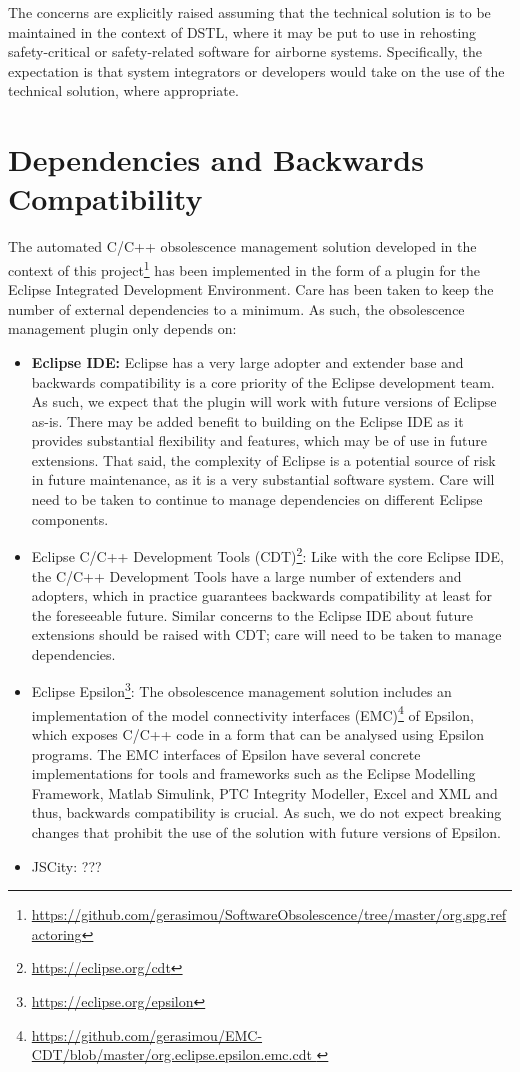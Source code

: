 \documentclass{llncs}
\begin{document}
The concerns are explicitly raised assuming that the technical solution is to be maintained in the context of DSTL, where it
may be put to use in rehosting safety-critical or safety-related software for airborne systems. Specifically, the expectation is that
system integrators or developers would take on the use of the technical solution, where appropriate.

\section{Dependencies and Backwards Compatibility}
The automated C/C++ obsolescence management solution developed in the context of this project\footnote{\url{https://github.com/gerasimou/SoftwareObsolescence/tree/master/org.spg.refactoring}} has been implemented in the form of a plugin for the Eclipse Integrated Development Environment. Care has been taken to keep the number of external dependencies to a minimum. As such, the obsolescence management plugin only depends on:
\begin{itemize}
\item \textbf{Eclipse IDE:} Eclipse has a very large adopter and extender base and backwards compatibility is a core priority of the Eclipse development team. As such, we expect that the plugin will work with future versions of Eclipse as-is. There may be added benefit to building on the Eclipse IDE as it provides substantial flexibility and features, which may be of use in future extensions. That said, the complexity of Eclipse is a potential source of risk in future maintenance, as it is a very substantial software system. Care will need to be taken to continue to manage dependencies on different Eclipse components.

\item Eclipse C/C++ Development Tools (CDT)\footnote{\url{https://eclipse.org/cdt}}: Like with the core Eclipse IDE, the C/C++ Development Tools have a large number of extenders and adopters, which in practice guarantees backwards compatibility at least for the foreseeable future. Similar concerns to the Eclipse IDE about future extensions should be raised with CDT; care will need to be taken to manage dependencies.

\item Eclipse Epsilon\footnote{\url{https://eclipse.org/epsilon}}: The obsolescence management solution includes an implementation of the model connectivity interfaces (EMC)\footnote{\url{https://github.com/gerasimou/EMC-CDT/blob/master/org.eclipse.epsilon.emc.cdt }} of Epsilon, which exposes C/C++ code in a form that can be analysed using Epsilon programs. The EMC interfaces of Epsilon have several concrete implementations for tools and frameworks such as the Eclipse Modelling Framework, Matlab Simulink, PTC Integrity Modeller, Excel and XML and thus, backwards compatibility is crucial. As such, we do not expect breaking changes that prohibit the use of the solution with future versions of Epsilon.

\item JSCity: ???
\end{itemize}
\end{document}
